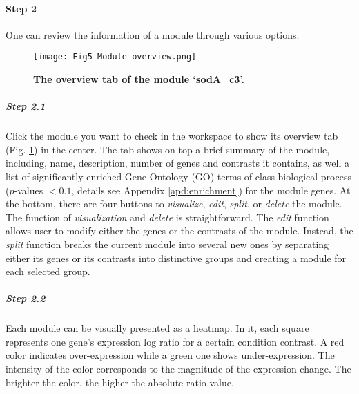 \begin{small} %
\paragraph{Step 2} One can review the information of a module through various 
options.

\begin{figure}[b]
	\centering
  	\texttt{[image: Fig5-Module-overview.png]}
	\caption[`sodA\_c3' module overview]{\textbf{The overview tab of 
	the module `sodA\_c3'.}}
	\label{fig:colombos-init-module}
\end{figure}

\subparagraph{Step 2.1}	Click the module you want to check in the workspace 
to show its overview tab (Fig.  \ref{fig:colombos-init-module}) in the center.
The tab shows on top a brief summary of the module, including, name,
description, number of genes and contrasts it contains, as well a list of
significantly enriched Gene Ontology (GO) terms of class biological process
($p$-values $< 0.1$, details see Appendix \ref{apd:enrichment}) for the module
genes.
%
At the bottom, there are four buttons to \textit{visualize}, \textit{edit},
\textit{split}, or \textit{delete} the module. The function of
\textit{visualization} and \textit{delete} is straightforward. The
\textit{edit} function allows user to modify either the genes or the contrasts
of the module. Instead, the \textit{split} function breaks the current module
into several new ones by separating either its genes or its contrasts into
distinctive groups and creating a module for each selected group.


\subparagraph{Step 2.2}	Each module can be visually presented as a heatmap. 
In it, each square represents one gene's expression log ratio for a certain
condition contrast. A red color indicates over-expression while a green one
shows under-expression. The intensity of the color corresponds to the
magnitude of the expression change. The brighter the color, the higher the
absolute ratio value.


\end{small}
